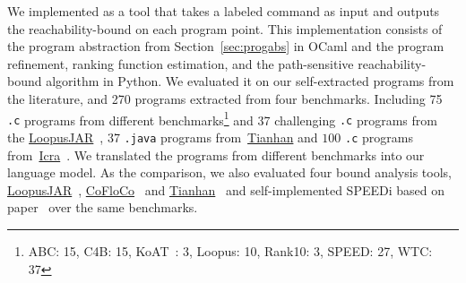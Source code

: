 We implemented {\THESYSTEM} as a tool that takes a labeled command as input 
and outputs the reachability-bound on each program point.
This implementation consists of the 
program abstraction from Section~\ref{sec:progabs} in OCaml and the program refinement, ranking function estimation, and the path-sensitive reachability-bound algorithm in Python.
We evaluated it on our self-extracted programs from the literature, and 270 programs extracted from four benchmarks. 
Including 75 {\tt .c} programs from different benchmarks\footnote{ABC: 15, C4B: 15, KoAT~\cite{BrockschmidtEFFG14,FalkeKS12,FalkeKS11}: 3, Loopus: 10, Rank10: 3, SPEED: 27, WTC: 37} and 37 challenging {\tt .c} programs 
from the \hyperlink{https://forsyte.at/static/people/sinn/loopusJAR/index.html}{LoopusJAR}~\cite{SinnZV17},
37 {\tt .java} programs from~\hyperlink{https://zenodo.org/record/5140586\#.Y5pBoC-B1QI}{Tianhan}\cite{LuCT21}
and $100$ {\tt .c} programs from~\hyperlink{https://github.com/icra-team/icra}{Icra}~\cite{KincaidBCR19,CyphertBKR19}.
We translated the programs from different benchmarks into our language model.
As the comparison, we also evaluated four bound analysis tools, 
\hyperlink{https://forsyte.at/software/loopus/}{LoopusJAR}~\cite{SinnZV17},
\hyperlink{https://github.com/aeflores/CoFloCo/tree/master/src}{CoFloCo}~\cite{Montoya17,Flores-Montoya16,Flores-MontoyaH14}
and \hyperlink{https://zenodo.org/record/5140586\#.Y5pBoC-B1QI}{Tianhan}~\cite{LuCT21}
and self-implemented SPEEDi based on paper~\cite{GulwaniJK09}
over the same benchmarks.

